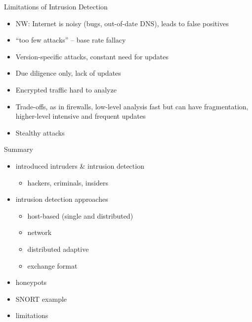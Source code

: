 \documentclass{beamer}
\begin{document}
\begin{frame}{Limitations of Intrusion Detection}
  \begin{itemize}
  \item NW: Internet is noisy (bugs, out-of-date DNS), leads to 
    false positives 
  \item ``too few attacks'' – base rate fallacy 
  \item Version-specific attacks, constant need for updates 
  \item Due diligence only, lack of updates 
  \item Encrypted traffic hard to analyze 
  \item Trade-offs, as in firewalls, low-level analysis fast but 
    can have fragmentation, higher-level intensive and 
    frequent updates 
  \item Stealthy attacks 
  \end{itemize}
\end{frame}

\begin{frame}{Summary}
  \begin{itemize}
  \item introduced intruders \& intrusion detection 
    \begin{itemize}
    \item hackers, criminals, insiders 
    \end{itemize}
  \item intrusion detection approaches 
    \begin{itemize}
    \item host-based (single and distributed) 
    \item network 
    \item distributed adaptive 
    \item exchange format 
    \end{itemize}
  \item honeypots 
  \item SNORT example 
  \item limitations
  \end{itemize}
\end{frame}
\end{document}
